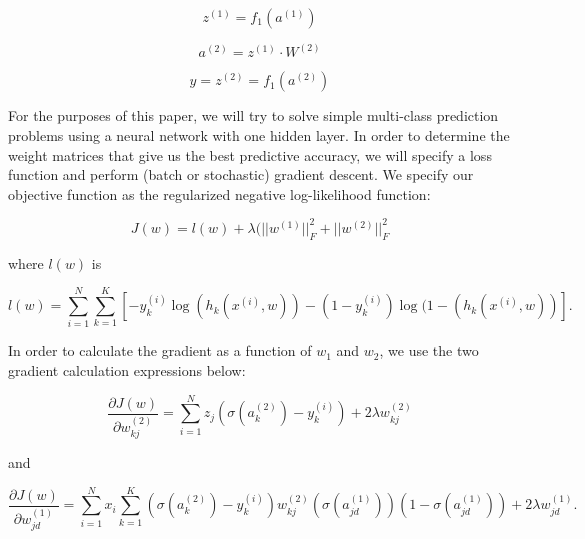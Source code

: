 \documentclass[10pt]{article}
\begin{document}
\begin{equation}
z^{(1)} = f_1(a^{(1)})
\end{equation}

\begin{equation}
a^{(2)} = z^{(1)}\cdot W^{(2)}	
\end{equation}

\begin{equation}
y = z^{(2)} = f_1(a^{(2)})
\end{equation}

For the purposes of this paper, we will try to solve simple multi-class prediction problems using a neural network with one hidden layer. In order to determine the weight matrices that give us the best predictive accuracy, we will specify a loss function and perform (batch or stochastic) gradient descent. We specify our objective function as the regularized negative log-likelihood function:

\begin{equation}
J(w) = l(w) +\lambda(||w^{(1)}||^2_F + ||w^{(2)}||^2_F
\end{equation}

\noindent where $l(w)$ is

\begin{equation}
l(w) = \sum_{i=1}^N \sum_{k=1}^{K} [-y_k^{(i)}\log(h_k(x^{(i)},w)) - (1-y_k^{(i)})\log(1-(h_k(x^{(i)},w))].
\end{equation}

In order to calculate the gradient as a function of $w_1$ and $w_2$, we use the two gradient calculation expressions below:

\begin{equation}
\frac{\partial J(w)}{\partial w_{kj}^{(2)}} = \sum_{i=1}^N z_j \left(\sigma(a_k^{(2)}) -y_k^{(i)} \right) + 2 \lambda w_{kj}^{(2)}
\end{equation}

\noindent and 

\begin{equation}
\frac{\partial J(w)}{\partial w_{jd}^{(1)}} =  \sum_{i=1}^N x_i \sum_{k=1}^{K} \left(\sigma(a_k^{(2)}) -y_k^{(i)}\right) w_{kj}^{(2)} \left(\sigma(a_{jd}^{(1)})\right)\left(1-\sigma(a_{jd}^{(1)})\right) + 2 \lambda w_{jd}^{(1)}.
\end{equation}
\end{document}
